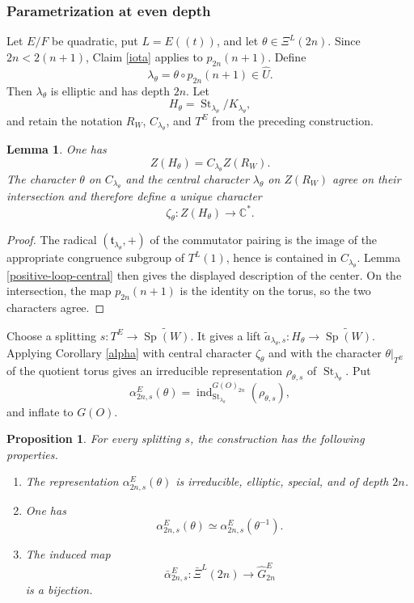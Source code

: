 \documentclass[11pt,a4paper,twoside]{amsart}
\newtheorem{lemma}[theorem]{Lemma}
\newtheorem{proposition}[theorem]{Proposition}
\theoremstyle{definition}
\theoremstyle{remark}
\newcommand{\tori}{\mathfrak t}
\newcommand{\bl}{\lambda}
\newcommand{\CC}{\mathbb C}
\newcommand{\ind}{\operatorname{ind}}
\newcommand{\St}{\operatorname{St}}
\newcommand{\Sp}{\operatorname{Sp}}
\begin{document}
\subsubsection{Parametrization at even depth}
Let $E/F$ be quadratic, put $L=E((t))$, and let $\theta\in\Xi^L(2n)$. Since $2n<2(n+1)$, Claim \ref{iota} applies to $p_{2n}(n+1)$. Define
$$
\bl_\theta=\theta\circ p_{2n}(n+1)\in\widehat U.
$$
Then $\bl_\theta$ is elliptic and has depth $2n$. Let
$$
H_\theta=\St_{\bl_\theta}/K_{\bl_\theta},
$$
and retain the notation $R_W$, $C_{\bl_\theta}$, and $T^E$ from the preceding construction.
\begin{lemma}\label{central-character-even}
One has
$$
Z(H_\theta)=C_{\bl_\theta}Z(R_W).
$$
The character $\theta$ on $C_{\bl_\theta}$ and the central character $\bl_\theta$ on $Z(R_W)$ agree on their intersection and therefore define a unique character
$$
\zeta_\theta:Z(H_\theta)\longrightarrow\CC^*.
$$
\end{lemma}
\begin{proof}
The radical $(\tori_{\bl_\theta},+)$ of the commutator pairing is the image of the appropriate congruence subgroup of $T^L(1)$, hence is contained in $C_{\bl_\theta}$. Lemma \ref{positive-loop-central} then gives the displayed description of the center. On the intersection, the map $p_{2n}(n+1)$ is the identity on the torus, so the two characters agree.
\end{proof}
Choose a splitting $s:T^E\to\widetilde{\Sp(W)}$. It gives a lift $\widetilde a_{\bl_\theta,s}:H_\theta\to\widetilde{\Sp(W)}$. Applying Corollary \ref{alpha} with central character $\zeta_\theta$ and with the character $\theta|_{T^E}$ of the quotient torus gives an irreducible representation $\rho_{\theta,s}$ of $\St_{\bl_\theta}$. Put
$$
\alpha_{2n,s}^E(\theta)
=
\ind_{\St_{\bl_\theta}}^{G(O)_{2n}}(\rho_{\theta,s}),
$$
and inflate to $G(O)$.
\begin{proposition}\label{even-fixed-splitting}
For every splitting $s$, the construction has the following properties.
\begin{enumerate}
\item The representation $\alpha_{2n,s}^E(\theta)$ is irreducible, elliptic, special, and of depth $2n$.
\item One has
$$
\alpha_{2n,s}^E(\theta)\simeq\alpha_{2n,s}^E(\theta^{-1}).
$$
\item The induced map
$$
\bar\alpha_{2n,s}^E:\bar\Xi^L(2n)\longrightarrow\widehat G_{2n}^E
$$
is a bijection.
\end{enumerate}
\end{proposition}
\end{document}
